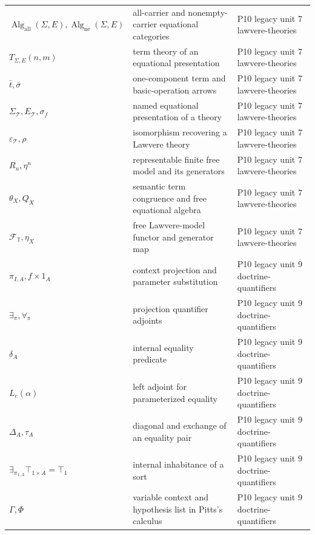 \begin{longtable}{@{}p{}p{}p{}@{}}
\(\operatorname{Alg}_{\mathrm{all}}(\Sigma,\allowbreak E),\allowbreak \operatorname{Alg}_{\mathrm{ne}}(\Sigma,\allowbreak E)\) & all-carrier and nonempty-carrier equational categories & P10 legacy unit 7 lawvere-\allowbreak{}theories \\
\(T_{\Sigma,E}(n,\allowbreak m)\) & term theory of an equational presentation & P10 legacy unit 7 lawvere-\allowbreak{}theories \\
\(\bar t,\allowbreak \bar\sigma\) & one-component term and basic-operation arrows & P10 legacy unit 7 lawvere-\allowbreak{}theories \\
\(\Sigma_{\mathcal T},\allowbreak E_{\mathcal T},\allowbreak \sigma_f\) & named equational presentation of a theory & P10 legacy unit 7 lawvere-\allowbreak{}theories \\
\(\varepsilon_{\mathcal T},\allowbreak \rho\) & isomorphism recovering a Lawvere theory & P10 legacy unit 7 lawvere-\allowbreak{}theories \\
\(R_n,\allowbreak \eta^n\) & representable finite free model and its generators & P10 legacy unit 7 lawvere-\allowbreak{}theories \\
\(\theta_X,\allowbreak Q_X\) & semantic term congruence and free equational algebra & P10 legacy unit 7 lawvere-\allowbreak{}theories \\
\(\mathcal F_{\mathbb T},\allowbreak \eta_X\) & free Lawvere-model functor and generator map & P10 legacy unit 7 lawvere-\allowbreak{}theories \\
\(\pi_{I,A},\allowbreak f\times1_A\) & context projection and parameter substitution & P10 legacy unit 9 doctrine-\allowbreak{}quantifiers \\
\(\exists_\pi,\allowbreak \forall_\pi\) & projection quantifier adjoints & P10 legacy unit 9 doctrine-\allowbreak{}quantifiers \\
\(\delta_A\) & internal equality predicate & P10 legacy unit 9 doctrine-\allowbreak{}quantifiers \\
\(L_e(\alpha)\) & left adjoint for parameterized equality & P10 legacy unit 9 doctrine-\allowbreak{}quantifiers \\
\(\Delta_A,\allowbreak \tau_A\) & diagonal and exchange of an equality pair & P10 legacy unit 9 doctrine-\allowbreak{}quantifiers \\
\(\exists_{\pi_{1,A}}\top_{1\times A}=\top_1\) & internal inhabitance of a sort & P10 legacy unit 9 doctrine-\allowbreak{}quantifiers \\
\(\Gamma,\allowbreak \Phi\) & variable context and hypothesis list in Pitts's calculus & P10 legacy unit 9 doctrine-\allowbreak{}quantifiers \\

\end{longtable}
